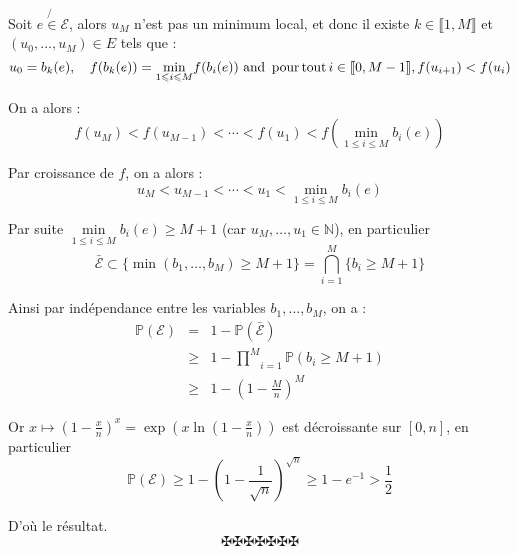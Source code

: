 \

Soit $e \not{\in} \mathcal{E}$, alors $u_M$ n'est pas un minimum local, et
donc il existe $k \in \llbracket 1, M \rrbracket$ et $(u_0, \ldots, u_M) \in
E$ tels que :
\[ u_0 = b_k (e), \quad f (b_k (e)) = \underset{1 \leqslant i \leqslant
   M}{\min} f (b_i (e)) \text{ and } \operatorname{pour} \operatorname{tout} i \in \llbracket 0,
   M - 1 \rrbracket, f (u_{i + 1}) < f (u_i) \]


On a alors :
\[ f (u_M) < f (u_{M - 1}) < \cdots < f (u_1) < f \left( \underset{1 \leqslant
   i \leqslant M}{\min} b_i (e) \right) \]


Par croissance de $f$, on a alors :
\[ u_M < u_{M - 1} < \cdots < u_1 < \underset{1 \leqslant i \leqslant M}{\min}
   b_i (e) \]


Par suite $\underset{1 \leqslant i \leqslant M}{\min} b_i (e) \geqslant M + 1$
(car $u_M, \ldots, u_1 \in \mathbb{N}$), en particulier
\[ \bar{\mathcal{E}} \subset \{ \min (b_1, \ldots, b_M) \geqslant M + 1 \} =
   \underset{i = 1}{\overset{M}{\bigcap}} \{ b_i \geqslant M + 1 \} \]


Ainsi par ind{\'e}pendance entre les variables $b_1, \ldots, b_M$, on a :
\begin{eqnarray*}
  \mathbb{P} (\mathcal{E}) & = & 1 -\mathbb{P} (\bar{\mathcal{E}})\\
  & \geqslant & 1 - \underset{i = 1}{\overset{M}{\prod}} \mathbb{P} (b_i
  \geqslant M + 1)\\
  & \geqslant & 1 - \left( 1 - \frac{M}{n} \right)^M
\end{eqnarray*}


Or $x \longmapsto \left( 1 - \frac{x}{n} \right)^x = \exp \left( x \ln \left(
1 - \frac{x}{n} \right) \right)$ est d{\'e}croissante sur $[0, n]$, en
particulier
\[ \mathbb{P} (\mathcal{E}) \geqslant 1 - \left( 1 - \frac{1}{\sqrt{n}}
   \right)^{\sqrt{n}} \geqslant 1 - e^{- 1} > \frac{1}{2} \]


D'o{\`u} le r{\'e}sultat.
\[ \maltese \maltese \maltese \maltese \maltese \maltese \maltese \]

